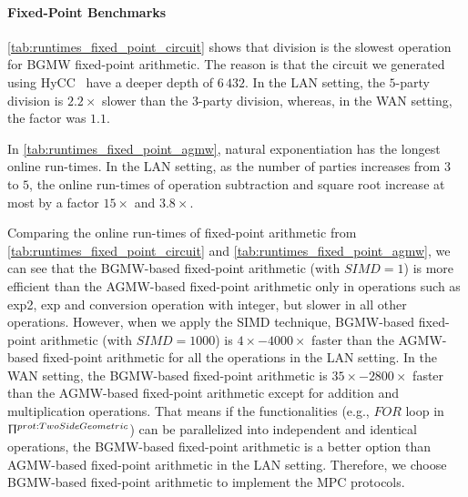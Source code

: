 \paragraph{Fixed-Point Benchmarks}
\label{para:Fixed-PointArithmeticBenchmarking}

\autoref{tab:runtimes_fixed_point_circuit} shows that division is the slowest operation for BGMW fixed-point arithmetic. The reason is that the circuit we generated using HyCC~\cite{buscher2018hycc} have a deeper depth of $6\,432$. In the LAN setting, the $5$-party division is $2.2\times $ slower than the $3$-party division, whereas, in the WAN setting, the factor was $1.1$.

In \autoref{tab:runtimes_fixed_point_agmw}, natural exponentiation has the longest online run-times. In the LAN setting, as the number of parties increases from $3$ to $5$, the online run-times of operation subtraction and square root increase at most by a factor $15\times$ and $3.8\times$.

Comparing the online run-times of fixed-point arithmetic from \autoref{tab:runtimes_fixed_point_circuit} and \autoref{tab:runtimes_fixed_point_agmw}, we can see that the BGMW-based fixed-point arithmetic (with $SIMD=1$) is more efficient than the AGMW-based fixed-point arithmetic only in operations such as exp2, exp and conversion operation with integer, but slower in all other operations.
However, when we apply the SIMD technique, BGMW-based fixed-point arithmetic (with $SIMD=1000$) is $4\times-4000\times$ faster than the AGMW-based fixed-point arithmetic for all the operations in the LAN setting. In the WAN setting, the BGMW-based fixed-point arithmetic is $35\times-2800\times$ faster than the AGMW-based fixed-point arithmetic except for addition and multiplication operations.
That means if the functionalities (e.g., $FOR$ loop in $\Uppi^{prot:TwoSideGeometric}$) can be parallelized into independent and identical operations, the BGMW-based fixed-point arithmetic is a better option than AGMW-based fixed-point arithmetic in the LAN setting.
Therefore, we choose BGMW-based fixed-point arithmetic to implement the MPC protocols.


